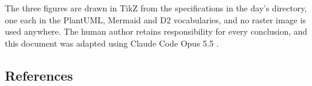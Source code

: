 The three figures are drawn in TikZ from the specifications in the day's
 directory, one each in the PlantUML, Mermaid and D2
vocabularies, and no raster image is used anywhere. The human author retains
responsibility for every conclusion, and this document was adapted using Claude
Code Opus 5.5 \cite{repo2026}.

\subsection{References}

\begin{apprefs}
\nocite{*}


\end{apprefs}
